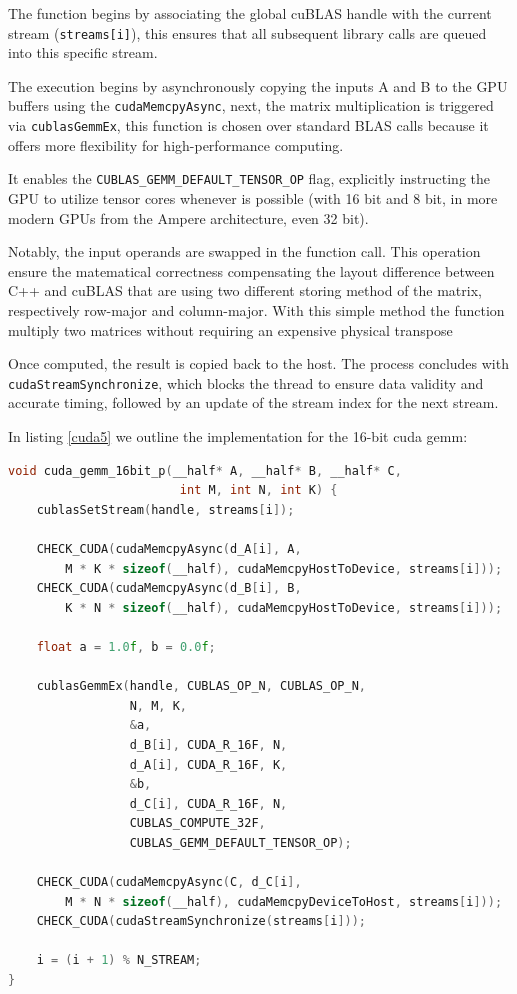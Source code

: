 The function begins by associating the global cuBLAS handle with the current stream (\texttt{streams[i]}), this ensures that all subsequent library calls are queued into this specific stream. 

The execution begins by asynchronously copying the inputs A and B to the GPU buffers using the \texttt{cudaMemcpyAsync}, next, the matrix multiplication is triggered via \texttt{cublasGemmEx}, this function is chosen over standard BLAS calls because it offers more flexibility for high-performance computing. 

It enables the \texttt{CUBLAS\_GEMM\_DEFAULT\_TENSOR\_OP} flag, explicitly instructing the GPU to utilize tensor cores whenever is possible (with 16 bit and 8 bit, in more modern GPUs from the Ampere architecture, even 32 bit). 

Notably, the input operands are swapped in the function call. This operation ensure the matematical correctness compensating the layout difference between C++ and cuBLAS that are using two different storing method of the matrix, respectively row-major and column-major. With this simple method the function multiply two matrices without requiring an expensive physical transpose

Once computed, the result is copied back to the host. The process concludes with \texttt{cudaStreamSynchronize}, which blocks the thread to ensure data validity and accurate timing, followed by an update of the stream index for the next stream.

In listing \ref{cuda5} we outline the implementation for the 16-bit cuda gemm:

\begin{lstlisting}[caption={cuda\_runner.cu 16-bit logic}, language=C++, label={cuda5}] 
void cuda_gemm_16bit_p(__half* A, __half* B, __half* C, 
                        int M, int N, int K) {
    cublasSetStream(handle, streams[i]);

    CHECK_CUDA(cudaMemcpyAsync(d_A[i], A, 
        M * K * sizeof(__half), cudaMemcpyHostToDevice, streams[i]));
    CHECK_CUDA(cudaMemcpyAsync(d_B[i], B, 
        K * N * sizeof(__half), cudaMemcpyHostToDevice, streams[i]));

    float a = 1.0f, b = 0.0f;

    cublasGemmEx(handle, CUBLAS_OP_N, CUBLAS_OP_N,
                 N, M, K, 
                 &a, 
                 d_B[i], CUDA_R_16F, N,
                 d_A[i], CUDA_R_16F, K,
                 &b, 
                 d_C[i], CUDA_R_16F, N, 
                 CUBLAS_COMPUTE_32F,
                 CUBLAS_GEMM_DEFAULT_TENSOR_OP);

    CHECK_CUDA(cudaMemcpyAsync(C, d_C[i], 
        M * N * sizeof(__half), cudaMemcpyDeviceToHost, streams[i]));
    CHECK_CUDA(cudaStreamSynchronize(streams[i]));

    i = (i + 1) % N_STREAM;
}
\end{lstlisting}

